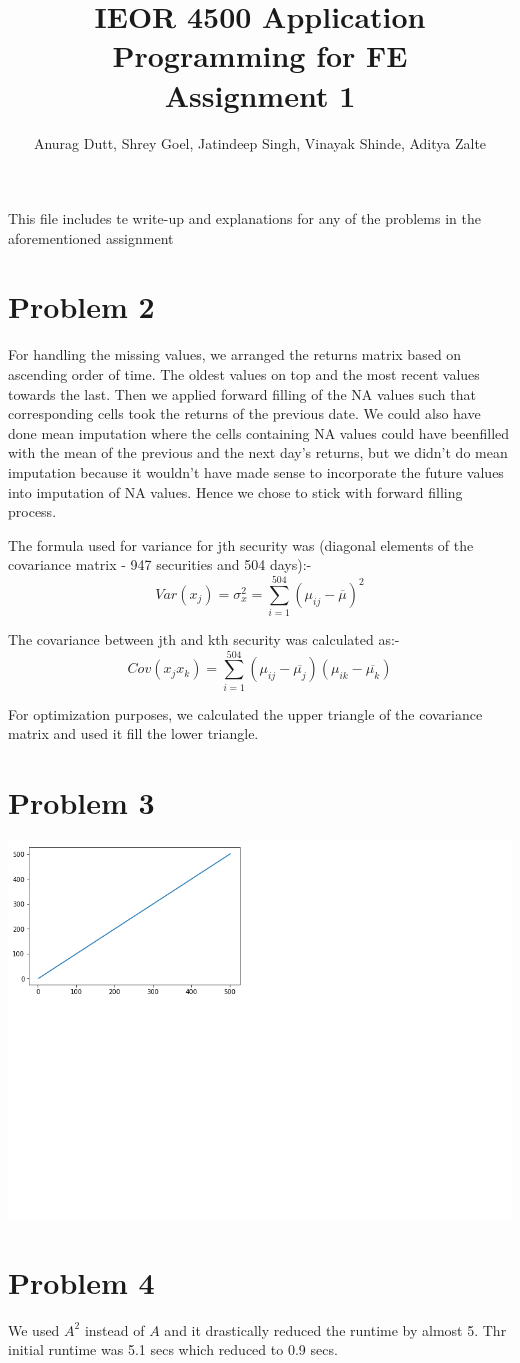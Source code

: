 \documentclass[twoside,11pt]{article}
\title{IEOR 4500 Application Programming for FE \\
  \large Assignment 1
} %
\author{Anurag Dutt, Shrey Goel, Jatindeep Singh, Vinayak Shinde, Aditya Zalte}    %
\begin{document}
\maketitle
This file includes te write-up and explanations for any of the problems in the aforementioned assignment

\section*{Problem 2}
For handling the missing values, we arranged the returns matrix	based on ascending order of time. The oldest values on top and the most	recent values towards the last.	Then we	applied	forward filling of the NA values such	that corresponding cells took the returns of the previous date.	We could also have done	mean imputation	where the cells	containing NA values could have	beenfilled with the mean of the previous and	the next day's returns,	but we didn't do mean imputation because it wouldn't have made sense to	incorporate the	future values into imputation of NA values. Hence we chose to stick with forward filling process.

The formula used for variance for jth security was (diagonal elements of the covariance matrix - 947 securities and 504 days):-
\begin{equation}
  Var(x_j) = \sigma_x^2 = \sum_{i = 1}^{504} (\mu_{ij}-\overline{\mu})^2
\end{equation}

The covariance between jth and kth security was calculated as:-
\begin{equation}
  Cov(x_jx_k) = \sum_{i = 1}^{504} (\mu_{ij}-\overline{\mu_j})(\mu_{ik}-\overline{\mu_k})
\end{equation}

For optimization purposes, we calculated the upper triangle of the covariance matrix and used it fill the lower triangle.

\section*{Problem 3}

\includegraphics{graph_q3.png}

\section*{Problem 4}
We used	$A^2$ instead of $A$ and it drastically reduced the runtime by almost 5. Thr initial runtime was 5.1 secs which reduced to 0.9 secs.
\end{document}
